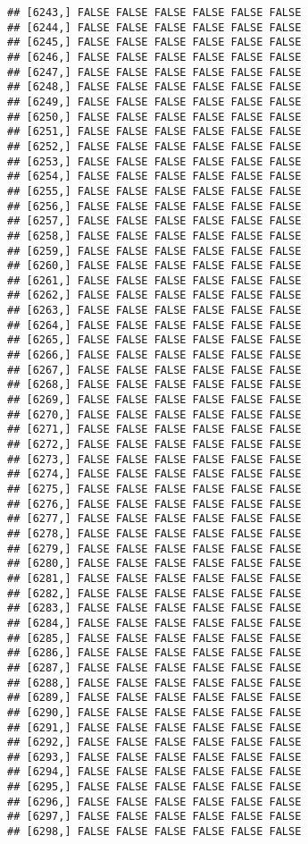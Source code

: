 \documentclass[
]{article}
\begin{document}
\begin{verbatim}
## [6243,] FALSE FALSE FALSE FALSE FALSE FALSE
## [6244,] FALSE FALSE FALSE FALSE FALSE FALSE
## [6245,] FALSE FALSE FALSE FALSE FALSE FALSE
## [6246,] FALSE FALSE FALSE FALSE FALSE FALSE
## [6247,] FALSE FALSE FALSE FALSE FALSE FALSE
## [6248,] FALSE FALSE FALSE FALSE FALSE FALSE
## [6249,] FALSE FALSE FALSE FALSE FALSE FALSE
## [6250,] FALSE FALSE FALSE FALSE FALSE FALSE
## [6251,] FALSE FALSE FALSE FALSE FALSE FALSE
## [6252,] FALSE FALSE FALSE FALSE FALSE FALSE
## [6253,] FALSE FALSE FALSE FALSE FALSE FALSE
## [6254,] FALSE FALSE FALSE FALSE FALSE FALSE
## [6255,] FALSE FALSE FALSE FALSE FALSE FALSE
## [6256,] FALSE FALSE FALSE FALSE FALSE FALSE
## [6257,] FALSE FALSE FALSE FALSE FALSE FALSE
## [6258,] FALSE FALSE FALSE FALSE FALSE FALSE
## [6259,] FALSE FALSE FALSE FALSE FALSE FALSE
## [6260,] FALSE FALSE FALSE FALSE FALSE FALSE
## [6261,] FALSE FALSE FALSE FALSE FALSE FALSE
## [6262,] FALSE FALSE FALSE FALSE FALSE FALSE
## [6263,] FALSE FALSE FALSE FALSE FALSE FALSE
## [6264,] FALSE FALSE FALSE FALSE FALSE FALSE
## [6265,] FALSE FALSE FALSE FALSE FALSE FALSE
## [6266,] FALSE FALSE FALSE FALSE FALSE FALSE
## [6267,] FALSE FALSE FALSE FALSE FALSE FALSE
## [6268,] FALSE FALSE FALSE FALSE FALSE FALSE
## [6269,] FALSE FALSE FALSE FALSE FALSE FALSE
## [6270,] FALSE FALSE FALSE FALSE FALSE FALSE
## [6271,] FALSE FALSE FALSE FALSE FALSE FALSE
## [6272,] FALSE FALSE FALSE FALSE FALSE FALSE
## [6273,] FALSE FALSE FALSE FALSE FALSE FALSE
## [6274,] FALSE FALSE FALSE FALSE FALSE FALSE
## [6275,] FALSE FALSE FALSE FALSE FALSE FALSE
## [6276,] FALSE FALSE FALSE FALSE FALSE FALSE
## [6277,] FALSE FALSE FALSE FALSE FALSE FALSE
## [6278,] FALSE FALSE FALSE FALSE FALSE FALSE
## [6279,] FALSE FALSE FALSE FALSE FALSE FALSE
## [6280,] FALSE FALSE FALSE FALSE FALSE FALSE
## [6281,] FALSE FALSE FALSE FALSE FALSE FALSE
## [6282,] FALSE FALSE FALSE FALSE FALSE FALSE
## [6283,] FALSE FALSE FALSE FALSE FALSE FALSE
## [6284,] FALSE FALSE FALSE FALSE FALSE FALSE
## [6285,] FALSE FALSE FALSE FALSE FALSE FALSE
## [6286,] FALSE FALSE FALSE FALSE FALSE FALSE
## [6287,] FALSE FALSE FALSE FALSE FALSE FALSE
## [6288,] FALSE FALSE FALSE FALSE FALSE FALSE
## [6289,] FALSE FALSE FALSE FALSE FALSE FALSE
## [6290,] FALSE FALSE FALSE FALSE FALSE FALSE
## [6291,] FALSE FALSE FALSE FALSE FALSE FALSE
## [6292,] FALSE FALSE FALSE FALSE FALSE FALSE
## [6293,] FALSE FALSE FALSE FALSE FALSE FALSE
## [6294,] FALSE FALSE FALSE FALSE FALSE FALSE
## [6295,] FALSE FALSE FALSE FALSE FALSE FALSE
## [6296,] FALSE FALSE FALSE FALSE FALSE FALSE
## [6297,] FALSE FALSE FALSE FALSE FALSE FALSE
## [6298,] FALSE FALSE FALSE FALSE FALSE FALSE

\end{verbatim}
\end{document}
